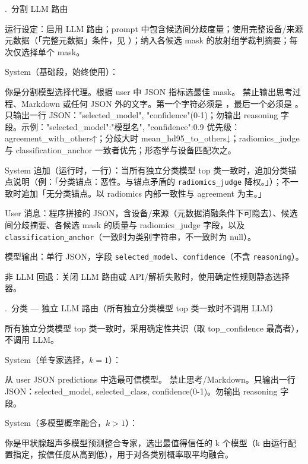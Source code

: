 \begin{responseappendixprose}
.~分割 LLM 路由
\par
运行设定：启用 LLM 路由；prompt 中包含候选间分歧度量；使用完整设备/来源元数据（「完整元数据」条件，见 ）；纳入各候选 mask 的放射组学裁判摘要；每次仅选择单个 mask。\par
System（基础段，始终使用）：\par
\begin{promptverbatim}
你是分割模型选择代理。根据 user 中 JSON 指标选最佳 mask。
禁止输出思考过程、Markdown 或任何 JSON 外的文字。第一个字符必须是 {，最后一个必须是 }。
只输出一行 JSON："selected_model", "confidence"(0-1)；勿输出 reasoning 字段。示例：{"selected_model":"模型名", "confidence":0.9}
优先级：agreement_with_others↑；分歧大时 mean_hd95_to_others↓；radiomics_judge 与 classification_anchor 一致者优先；形态学与设备匹配次之。
\end{promptverbatim}
System 追加（运行时，一行）：当所有独立分类模型 top 类一致时，追加分类锚点说明（例：「分类锚点：恶性。与锚点矛盾的 \texttt{radiomics\_judge} 降权。」）；不一致时追加「无分类锚点。以 radiomics 内部一致性与 agreement 为主。」\par
User 消息：程序拼接的 JSON，含设备/来源（元数据消融条件下可隐去）、候选间分歧摘要、各候选 mask 的质量与 radiomics\_judge 字段，以及 \texttt{classification\_anchor}（一致时为类别字符串，不一致时为 null）。\par
模型输出：单行 JSON，字段 \texttt{selected\_model}、\texttt{confidence}（不含 \texttt{reasoning}）。\par
非 LLM 回退：关闭 LLM 路由或 API/解析失败时，使用确定性规则静态选择器。\par
{}.~分类 --- 独立 LLM 路由（所有独立分类模型 top 类一致时不调用 LLM）
\par
所有独立分类模型 top 类一致时，采用确定性共识（取 top\_confidence 最高者），不调用 LLM。\par
System（单专家选择，$k{=}1$）：\par
\begin{promptverbatim}
从 user JSON  predictions 中选最可信模型。
禁止思考/Markdown。只输出一行 JSON：selected_model, selected_class, confidence(0-1)。勿输出 reasoning 字段。
\end{promptverbatim}
System（多模型概率融合，$k>1$）：\par
\begin{promptverbatim}
你是甲状腺超声多模型预测整合专家，选出最值得信任的 k 个模型（k 由运行配置指定，按信任度从高到低），用于对各类别概率取平均融合。

\end{promptverbatim}
\end{responseappendixprose}
